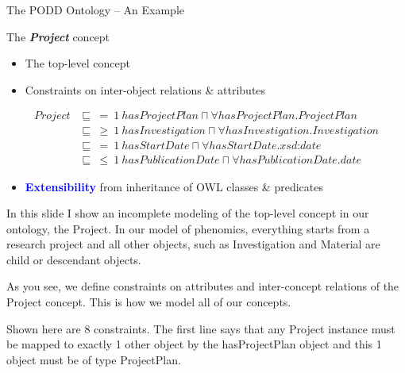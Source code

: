 \documentclass[ignorenonframetext,compress]{beamer}
\begin{document}
\begin{frame}{The PODD Ontology -- An Example}
\begin{example}{The \textbf{\emph{Project}} concept}
    \begin{itemize}
    \item The top-level concept
    \item Constraints on inter-object relations \& attributes
    \end{itemize}
    \pause
    {\small
    \begin{align*}
    Project &\sqsubseteq~ =~ 1~ hasProjectPlan \sqcap \forall hasProjectPlan.ProjectPlan\\
            &\sqsubseteq~ \geq~ 1~ hasInvestigation \sqcap \forall hasInvestigation.Investigation\\
            &\sqsubseteq~ =~ 1~ hasStartDate \sqcap \forall hasStartDate.\textit{xsd:date}\\
            &\sqsubseteq~ \leq~ 1~ hasPublicationDate \sqcap \forall hasPublicationDate.date
    \end{align*}}
\end{example}
\begin{block}{}
    \begin{itemize}
    \item \textcolor{blue}{\textbf{Extensibility}} from inheritance of OWL classes \& predicates
    \end{itemize}
\end{block}
\end{frame}

In this slide I show an incomplete modeling of the top-level concept
in our ontology, the Project. In our model of phenomics, everything starts 
from a research project and all other objects, such as Investigation and
Material are child or descendant objects. 

As you see, we define constraints on attributes and inter-concept relations
of the Project concept. This is how we model all of our concepts.

Shown here are 8 constraints. The first line says that any Project instance must
be mapped to exactly 1 other object by the hasProjectPlan object and this 1 object
must be of type ProjectPlan.
\end{document}
